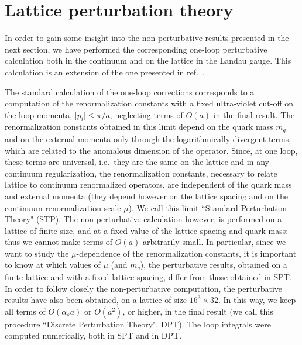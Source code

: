 \section{Lattice perturbation theory}
\label{sec:per}

In order to gain some insight into the non-perturbative results
presented in the next section, we have performed the corresponding
one-loop perturbative calculation both in the continuum and
on the lattice  in the Landau gauge. This calculation is an extension of
the one presented in
ref.\ \cite{newi}.

The standard calculation of the one-loop corrections
corresponds to a computation of  the renormalization constants with a fixed
ultra-violet
cut-off on the loop momenta, $\vert p_i \vert \le \pi/a$,  neglecting terms
of $O(a)$ in the final result. The renormalization constants obtained in
this limit depend on the quark mass $m_q$ and on the external momenta only
through the logarithmically divergent terms, which are related to the anomalous
dimension of the operator. Since, at one loop, these terms are universal, i.e.\
they are the same on the lattice and in any  continuum regularization,
the renormalization constants, necessary to relate lattice to continuum
renormalized operators, are independent of the quark mass and external momenta
(they depend however on the lattice spacing and on the continuum
renormalization scale $\mu$). We call this limit ``Standard Perturbation
Theory"
(STP).
The non-perturbative calculation however, is performed  on a lattice of finite
size, and at a fixed value of the lattice spacing and  quark
mass: thus we cannot make  terms of $O(a)$ arbitrarily small. In particular,
since we want to study the $\mu$-dependence of the renormalization constants,
it
is important to know at which values of $\mu$ (and $m_q$),
the perturbative results, obtained on
a finite lattice and with a fixed lattice spacing,
differ from those obtained in SPT. In  order to follow closely the
non-perturbative computation,   the perturbative  results have also been
obtained, on a lattice of size $16^3 \times 32$. In this way,
we keep
 all terms of $O(\alpha_s a)$ or $O(a^2)$, or higher, in the final
result (we call this procedure ``Discrete Perturbation Theory", DPT).   The
loop integrals were
computed  numerically, both in SPT and in DPT.

